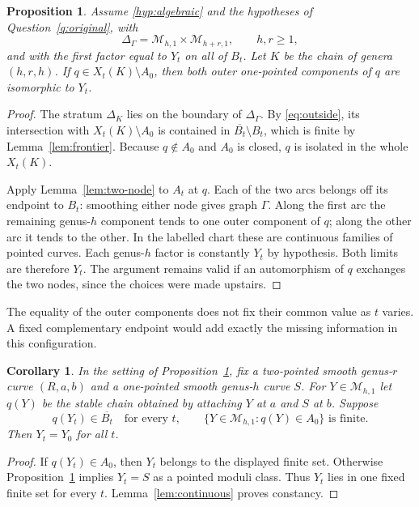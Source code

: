 \documentclass[11pt]{article}
\newcommand{\M}{\mathcal M}
\newcommand{\cl}[1]{\overline{#1}}
\newtheorem{proposition}[theorem]{Proposition}
\newtheorem{corollary}[theorem]{Corollary}
\theoremstyle{definition}
\theoremstyle{remark}
\begin{document}
\begin{proposition}\label{prop:outer}
Assume \eqref{hyp:algebraic} and the hypotheses of Question~\ref{q:original}, with
\[
 \Delta_\Gamma=\M_{h,1}\times\M_{h+r,1},\qquad h,r\geq1,
\]
and with the first factor equal to $Y_t$ on all of $B_t$. Let $K$ be the chain of genera $(h,r,h)$. If $q\in X_t(K)\setminus A_0$, then both outer one-pointed components of $q$ are isomorphic to $Y_t$.
\end{proposition}

\begin{proof}
The stratum $\Delta_K$ lies on the boundary of $\Delta_\Gamma$. By \eqref{eq:outside}, its intersection with $X_t(K)\setminus A_0$ is contained in $\cl{B_t}\setminus B_t$, which is finite by Lemma~\ref{lem:frontier}. Because $q\notin A_0$ and $A_0$ is closed, $q$ is isolated in the whole $X_t(K)$.

Apply Lemma~\ref{lem:two-node} to $A_t$ at $q$. Each of the two arcs belongs off its endpoint to $B_t$: smoothing either node gives graph $\Gamma$. Along the first arc the remaining genus-$h$ component tends to one outer component of $q$; along the other arc it tends to the other. In the labelled chart these are continuous families of pointed curves. Each genus-$h$ factor is constantly $Y_t$ by hypothesis. Both limits are therefore $Y_t$. The argument remains valid if an automorphism of $q$ exchanges the two nodes, since the choices were made upstairs.
\end{proof}

The equality of the outer components does not fix their common value as $t$ varies. A fixed complementary endpoint would add exactly the missing information in this configuration.

\begin{corollary}\label{cor:fixed-complement}
In the setting of Proposition~\ref{prop:outer}, fix a two-pointed smooth genus-$r$ curve $(R,a,b)$ and a one-pointed smooth genus-$h$ curve $S$. For $Y\in\M_{h,1}$ let $q(Y)$ be the stable chain obtained by attaching $Y$ at $a$ and $S$ at $b$. Suppose
\[
 q(Y_t)\in\cl{B_t}\quad\text{for every }t,
 \qquad
 \{Y\in\M_{h,1}:q(Y)\in A_0\}\text{ is finite}.
\]
Then $Y_t=Y_0$ for all $t$.
\end{corollary}

\begin{proof}
If $q(Y_t)\in A_0$, then $Y_t$ belongs to the displayed finite set. Otherwise Proposition~\ref{prop:outer} implies $Y_t=S$ as a pointed moduli class. Thus $Y_t$ lies in one fixed finite set for every $t$. Lemma~\ref{lem:continuous} proves constancy.
\end{proof}
\end{document}
